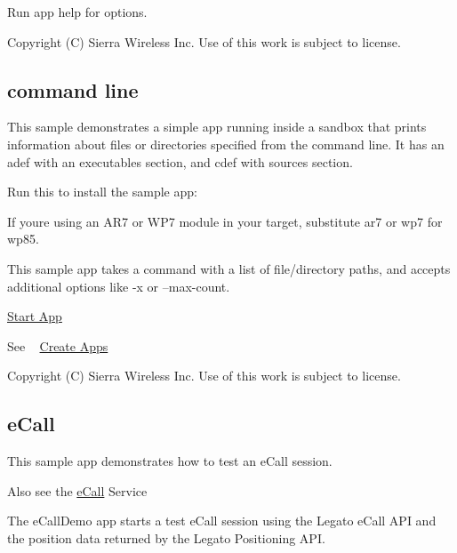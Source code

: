 Run {\ttfamily app} {\ttfamily help} for options.





Copyright (C) Sierra Wireless Inc. Use of this work is subject to license. \hypertarget{sampleApps_commandLine}{}\subsection{command line}\label{sampleApps_commandLine}
This sample demonstrates a simple app running inside a sandbox that prints information about files or directories specified from the command line. It has an {\ttfamily adef} with an executables section, and {\ttfamily cdef} with sources section.

Run this to install the sample app\+:



If you\textquotesingle{}re using an A\+R7 or W\+P7 module in your target, substitute {\ttfamily ar7} or {\ttfamily wp7} for wp85.

This sample app takes a command with a list of file/directory paths, and accepts additional options like {\ttfamily -\/x} or {\ttfamily --max-\/count}.

\hyperlink{sample_apps_sampleApps_startApp}{Start App}





See ~\newline
 \hyperlink{basicAppsCreate}{Create Apps} 



Copyright (C) Sierra Wireless Inc. Use of this work is subject to license. \hypertarget{sampleApps_eCall}{}\subsection{e\+Call}\label{sampleApps_eCall}
This sample app demonstrates how to test an e\+Call session.

Also see the \hyperlink{c_ecall}{e\+Call} Service





The {\ttfamily e\+Call\+Demo} app starts a test e\+Call session using the Legato e\+Call A\+P\+I and the position data returned by the Legato Positioning A\+P\+I.


